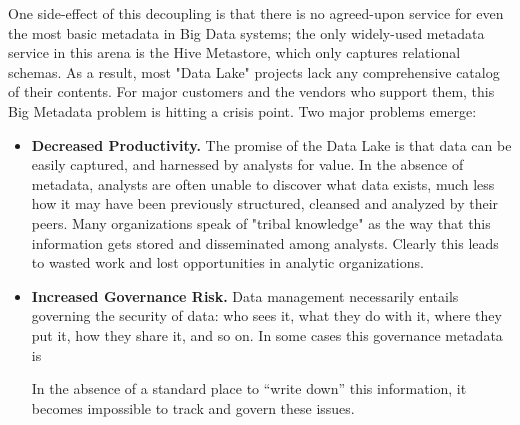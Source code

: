 \documentclass{sig-alternate}
\begin{document}
One side-effect of this decoupling is that there is no agreed-upon service for even the most basic metadata in Big Data systems; the only widely-used metadata service in this arena is the Hive Metastore, which only captures relational schemas. As a result, most "Data Lake" projects lack any comprehensive catalog of their contents. For major customers and the vendors who support them, this Big Metadata problem is hitting a crisis point.  Two major problems emerge:
\begin{itemize}
\item \textbf{Decreased Productivity.} The promise of the Data Lake is that data can be easily captured, and harnessed by analysts for value. In the absence of metadata, analysts are often unable to discover what data exists, much less how it may have been previously structured, cleansed and analyzed by their peers. Many organizations speak of "tribal knowledge" as the way that this information gets stored and disseminated among analysts. Clearly this leads to wasted work and lost opportunities in analytic organizations.
\item \textbf{Increased Governance Risk.} Data management necessarily entails governing the security of data: who sees it, what they do with it, where they put it, how they share it, and so on. In some cases this governance metadata is 

In the absence of a standard place to ``write down'' this information, it becomes impossible to track and govern these issues.
\end{itemize}
\end{document}
